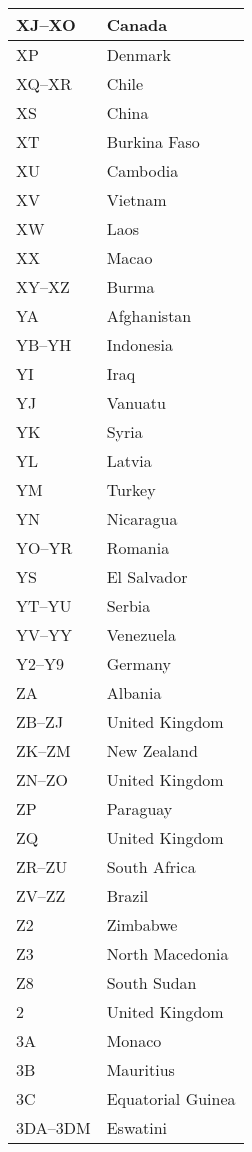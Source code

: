 \begin{longtable}{|l|l|}
	\hline
	XJ--XO & Canada \\
	\hline
	XP & Denmark \\
	\hline
	XQ--XR & Chile \\
	\hline
	XS & China \\
	\hline
	XT & Burkina Faso \\
	\hline
	XU & Cambodia \\
	\hline
	XV & Vietnam \\
	\hline
	XW & Laos \\
	\hline
	XX & Macao \\
	\hline
	XY--XZ & Burma \\
	\hline
	YA & Afghanistan \\
	\hline
	YB--YH & Indonesia \\
	\hline
	YI & Iraq \\
	\hline
	YJ & Vanuatu \\
	\hline
	YK & Syria \\
	\hline
	YL & Latvia \\
	\hline
	YM & Turkey \\
	\hline
	YN & Nicaragua \\
	\hline
	YO--YR & Romania \\
	\hline
	YS & El Salvador \\
	\hline
	YT--YU & Serbia \\
	\hline
	YV--YY & Venezuela \\
	\hline
	Y2--Y9 & Germany \\
	\hline
	ZA & Albania \\
	\hline
	ZB--ZJ & United Kingdom \\
	\hline
	ZK--ZM & New Zealand \\
	\hline
	ZN--ZO & United Kingdom \\
	\hline
	ZP & Paraguay \\
	\hline
	ZQ & United Kingdom \\
	\hline
	ZR--ZU & South Africa \\
	\hline
	ZV--ZZ & Brazil \\
	\hline
	Z2 & Zimbabwe \\
	\hline
	Z3 & North Macedonia \\
	\hline
	Z8 & South Sudan \\
	\hline
	2 & United Kingdom \\
	\hline
	3A & Monaco \\
	\hline
	3B & Mauritius \\
	\hline
	3C & Equatorial Guinea \\
	\hline
	3DA--3DM & Eswatini \\

\end{longtable}
